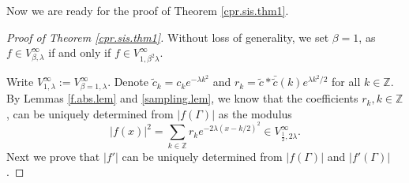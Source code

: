\documentclass[11pt,oneside,reqno]{amsart}
\numberwithin{equation}{section}
\def\Z{ {\mathbb Z} }
\begin{document}
Now we are ready for the proof of Theorem \ref{cpr.sis.thm1}.
\begin{proof}[Proof of Theorem \ref{cpr.sis.thm1}]
Without loss of generality, we set $\beta=1$, as  $f \in V^\infty_{\beta,\lambda}$
if and only if  $f\in V^\infty_{1,\beta^{2}\lambda}$. 

Write $V^\infty_{1,\lambda} := V^\infty_{\beta=1,\lambda}$.  Denote $\tilde{c}_k=c_ke^{-\lambda k^2}$ and $r_k=\tilde c\ast \bar {\tilde c}(k)e^{\lambda k^2/2}$ for all $k\in\Z$. %
By Lemmas \ref{f.abs.lem} and \ref{sampling.lem}, we know that the coefficients $r_k, k\in\Z$, can be uniquely determined from $|f(\Gamma)|$ as the modulus %
\begin{equation}\label{f.mod}
|f(x)|^2=\sum_{k\in\Z} r_ke^{-2\lambda(x-k/2)^2}\in V^\infty_{\frac{1}{2}, 2\lambda}.
\end{equation}
 Next we  prove that $|f'|$ can be uniquely determined from $|f(\Gamma)|$ and $|f'(\Gamma)|$.



\end{proof}
\end{document}
